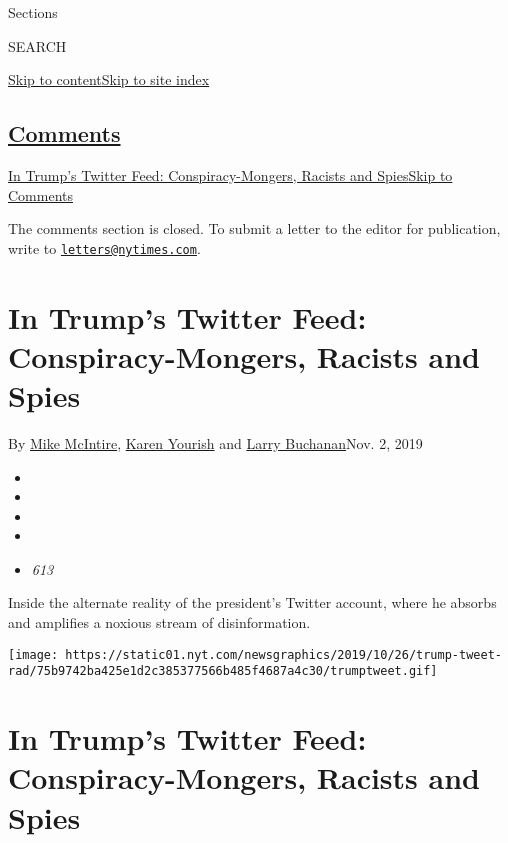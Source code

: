 Sections

SEARCH

\protect\hyperlink{site-content}{Skip to
content}\protect\hyperlink{site-index}{Skip to site index}

\hypertarget{comments}{%
\subsection{\texorpdfstring{\protect\hyperlink{commentsContainer}{Comments}}{Comments}}\label{comments}}

\href{}{In Trump's Twitter Feed: Conspiracy-Mongers, Racists and
Spies}\href{}{Skip to Comments}

The comments section is closed. To submit a letter to the editor for
publication, write to
\href{mailto:letters@nytimes.com}{\nolinkurl{letters@nytimes.com}}.

\hypertarget{in-trumps-twitter-feed-conspiracy-mongers-racists-and-spies}{%
\section{In Trump's Twitter Feed: Conspiracy-Mongers, Racists and
Spies}\label{in-trumps-twitter-feed-conspiracy-mongers-racists-and-spies}}

By \href{https://www.nytimes.com/by/mike-mcintire}{Mike McIntire},
\href{https://www.nytimes.com/by/karen-yourish}{Karen Yourish} and
\href{https://www.nytimes.com/by/larry-buchanan}{Larry Buchanan}Nov. 2,
2019

\begin{itemize}
\item
\item
\item
\item
\item
  \emph{613}
\end{itemize}

Inside the alternate reality of the president's Twitter account, where
he absorbs and amplifies a noxious stream of disinformation.

\texttt{[image: https://static01.nyt.com/newsgraphics/2019/10/26/trump-tweet-rad/75b9742ba425e1d2c385377566b485f4687a4c30/trumptweet.gif]}

\hypertarget{in-trumps-twitter-feed-conspiracy-mongers-racists-and-spies-1}{%
\section{In Trump's Twitter Feed: Conspiracy-Mongers, Racists and
Spies}\label{in-trumps-twitter-feed-conspiracy-mongers-racists-and-spies-1}}

